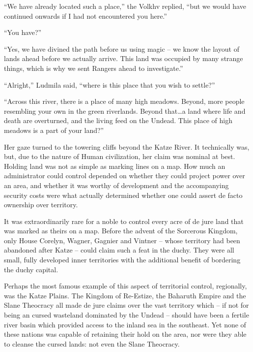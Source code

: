  

“We have already located such a place,” the Volkhv replied, “but we would have continued onwards if I had not encountered you here.”

 

“You have?”

 

“Yes, we have divined the path before us using magic – we know the layout of lands ahead before we actually arrive. This land was occupied by many strange things, which is why we sent Rangers ahead to investigate.”

 

“Alright,” Ludmila said, “where is this place that you wish to settle?”

 

“Across this river, there is a place of many high meadows. Beyond, more people resembling your own in the green riverlands. Beyond that…a land where life and death are overturned, and the living feed on the Undead. This place of high meadows is a part of your land?”

 

Her gaze turned to the towering cliffs beyond the Katze River. It technically was, but, due to the nature of Human civilization, her claim was nominal at best. Holding land was not as simple as marking lines on a map. How much an administrator could control depended on whether they could project power over an area, and whether it was worthy of development and the accompanying security costs were what actually determined whether one could assert de facto ownership over territory.

 

It was extraordinarily rare for a noble to control every acre of de jure land that was marked as theirs on a map. Before the advent of the Sorcerous Kingdom, only House Corelyn, Wagner, Gagnier and Vintner – whose territory had been abandoned after Katze – could claim such a feat in the duchy. They were all small, fully developed inner territories with the additional benefit of bordering the duchy capital.

 

Perhaps the most famous example of this aspect of territorial control, regionally, was the Katze Plains. The Kingdom of Re-Estize, the Baharuth Empire and the Slane Theocracy all made de jure claims over the vast territory which – if not for being an cursed wasteland dominated by the Undead – should have been a fertile river basin which provided access to the inland sea in the southeast. Yet none of these nations was capable of retaining their hold on the area, nor were they able to cleanse the cursed lands: not even the Slane Theocracy.

